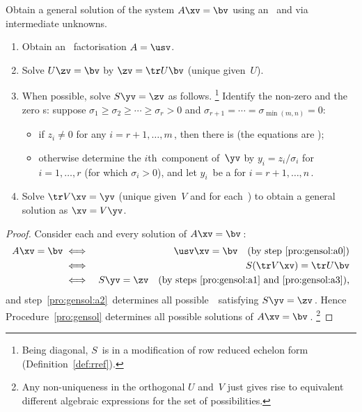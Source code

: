 





\begin{procedure}\label{pro:gensol}
    Obtain a general solution of the system $A\xv=\bv$ using an \svd\ and via intermediate unknowns.
    \begin{enumerate}
    \item \label{pro:gensol:a0} Obtain an \svd\ factorisation \(A=\usv\).
        \item \label{pro:gensol:a1} Solve \(U\zv=\bv\) by $\zv=\tr U\bv$ (unique given~\(U\)).
    
        \item \label{pro:gensol:a2} When possible, solve \(S\yv=\zv\) as follows.
        \footnote{Being diagonal, \(S\)~is in a modification of row reduced echelon form (Definition~\ref{def:rref}).}  
        Identify the non-zero and the zero s: suppose \(\sigma_1\geq\sigma_2\geq\cdots\geq\sigma_r>0\) and \(\sigma_{r+1}=\cdots=\sigma_{\min(m,n)}=0\):
\begin{itemize}
\item         if $z_i\neq0$ for any \(i=r+1,\ldots,m\)\,, then there is  (the equations are );
        
\item        otherwise determine the $i$th~component of~$\yv$ by
        $y_i=z_i/\sigma_i$ for $i=1,\ldots,r$  (for which $\sigma_i> 0$), and let $y_i$~be a  for $i=r+1,\ldots,n$\,. 

\end{itemize}
    
        \item \label{pro:gensol:a3} Solve \(\tr V\xv=\yv\) (unique given~\(V\) and for each~\yv) to obtain a general solution as $\xv=V\yv$.
    \end{enumerate}
\end{procedure}

\begin{proof} 
Consider each and every solution of \(A\xv=\bv\)\,:
\begin{eqnarray*}
A\xv=\bv
  &\iff& \usv\xv=\bv \quad\text{(by step~\ref{pro:gensol:a0})}
\\&\iff& S(\tr V\xv)=\tr U\bv
\\&\iff& S\yv=\zv\quad\text{(by steps~\ref{pro:gensol:a1} and~\ref{pro:gensol:a3}),}
\end{eqnarray*}
and step~\ref{pro:gensol:a2}\ determines all possible~\yv\ satisfying \(S\yv=\zv\)\,.
Hence Procedure~\ref{pro:gensol} determines all possible solutions of \(A\xv=\bv\)\,.%
\footnote{Any non-uniqueness in the orthogonal \(U\) and~\(V\) just gives rise to equivalent different algebraic expressions for the set of possibilities.}
\end{proof}



